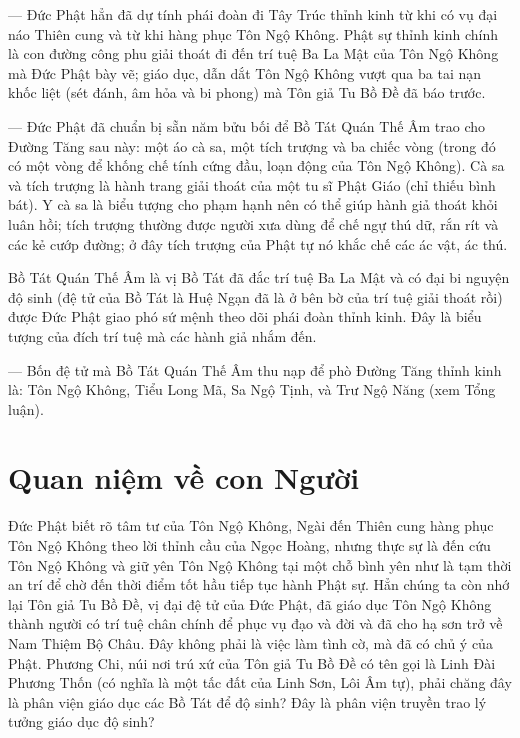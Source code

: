 — Đức Phật hẳn đã dự tính phái đoàn đi Tây Trúc thỉnh kinh từ khi có vụ đại náo Thiên cung và từ khi hàng phục Tôn Ngộ Không. Phật sự thỉnh kinh chính là con đường công phu giải thoát đi đến trí tuệ Ba La Mật của Tôn Ngộ Không mà Đức Phật bày vẽ; giáo dục, dẫn dắt Tôn Ngộ Không vượt qua ba tai nạn khốc liệt (sét đánh, âm hỏa và bi phong) mà Tôn giả Tu Bồ Đề đã báo trước.

— Đức Phật đã chuẩn bị sẵn năm bửu bối để Bồ Tát Quán Thế Âm trao cho Đường Tăng sau này: một áo cà sa, một tích trượng và ba chiếc vòng (trong đó có một vòng để khống chế tính cứng đầu, loạn động của Tôn Ngộ Không). Cà sa và tích trượng là hành trang giải thoát của một tu sĩ Phật Giáo (chỉ thiếu bình bát). Y cà sa là biểu tượng cho phạm hạnh nên có thể giúp hành giả thoát khỏi luân hồi; tích trượng thường được người xưa dùng để chế ngự thú dữ, rắn rít và các kẻ cướp đường; ở đây tích trượng của Phật tự nó khắc chế các ác vật, ác thú.

Bồ Tát Quán Thế Âm là vị Bồ Tát đã đắc trí tuệ Ba La Mật và có đại bi nguyện độ sinh (đệ tử của Bồ Tát là Huệ Ngạn đã là ở bên bờ của trí tuệ giải thoát rồi) được Đức Phật giao phó sứ mệnh theo dõi phái đoàn thỉnh kinh. Đây là biểu tượng của đích trí tuệ mà các hành giả nhắm đến.

— Bốn đệ tử mà Bồ Tát Quán Thế Âm thu nạp để phò Đường Tăng thỉnh kinh là: Tôn Ngộ Không, Tiểu Long Mã, Sa Ngộ Tịnh, và Trư Ngộ Năng (xem Tổng luận).

\section{Quan niệm về con Người} %
\label{sec:8_con_nguoi}

Đức Phật biết rõ tâm tư của Tôn Ngộ Không, Ngài đến Thiên cung hàng phục Tôn Ngộ Không theo lời thỉnh cầu của Ngọc Hoàng, nhưng thực sự là đến cứu Tôn Ngộ Không và giữ yên Tôn Ngộ Không tại một chỗ bình yên như là tạm thời an trí để chờ đến thời điểm tốt hầu tiếp tục hành Phật sự. Hẳn chúng ta còn nhớ lại Tôn giả Tu Bồ Đề, vị đại đệ tử của Đức Phật, đã giáo dục Tôn Ngộ Không thành người có trí tuệ chân chính để phục vụ đạo và đời và đã cho hạ sơn trở về Nam Thiệm Bộ Châu. Đây không phải là việc làm tình cờ, mà đã có chủ ý của Phật. Phương Chi, núi nơi trú xứ của Tôn giả Tu Bồ Đề có tên gọi là Linh Đài Phương Thốn (có nghĩa là một tấc đất của Linh Sơn, Lôi Âm tự), phải chăng đây là phân viện giáo dục các Bồ Tát để độ sinh? Đây là phân viện truyền trao lý tưởng giáo dục độ sinh?

